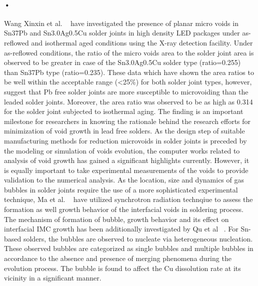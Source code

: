\paragraph*{•}
Wang Xinxin et al. ~\cite{WXinxin2012} have investigated the presence of planar micro voids in Sn37Pb and Sn3.0Ag0.5Cu solder joints in high density LED packages under as-reflowed and isothermal 
aged conditions using the X-ray detection facility. Under as-reflowed conditions, the ratio of the micro voids area to the solder joint area is observed to be greater in case of the
Sn3.0Ag0.5Cu solder type (ratio=0.255) than Sn37Pb type (ratio=0.235). These data which have shown the area ratios to be well within the acceptable range (<25$\%$) for both solder
joint types, however, suggest that Pb free solder joints are more susceptible to microvoiding than the leaded solder joints. Moreover, the area ratio was observed to be as high as 0.314 for
the solder joint subjected to isothermal aging. The finding is an important milestone for researchers in knowing the rationale behind the research efforts for minimization of void growth in lead free solders. As the design step of suitable manufacturing methods for reduction microvoids in solder joints is preceded by the modeling or simulation of voids evolution, the computer works related to analysis of void growth has gained a significant highlights currently. However, it is equally important to take experimental measurements of the voids to provide validation to the numerical analysis.
As the location, size and dynamics of gas bubbles in solder joints require the use of a more sophisticated experimental technique, Ma et al. ~\cite{HMa2012} have utilized synchrotron radiation technqiue to assess the formation as well growth behavior of the interfacial voids in soldering process. The mechanism of formation of bubble, growth behavior and its effect on interfacial IMC growth has been additionally investigated by Qu et al ~\cite{LQu2014APSUSC}. For Sn-based solders, the bubbles are observed to nucleate via heterogeneous nucleation. These observed bubbles are categorized as single bubbles and multiple bubbles in accordance to the absence and presence of  merging phenomena during the evolution process. The bubble is found to affect the Cu dissolution rate at its vicinity in a significant manner.

